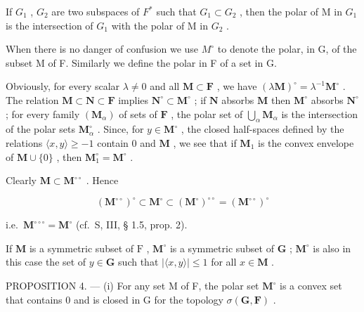 If \(G_{1}\) , \(G_{2}\) are two subspaces of \(F^{*}\) such that \(G_{1} \subset G_{2}\) , then the polar of M in \(G_{1}\) is the intersection of \(G_{1}\) with the polar of M in \(G_{2}\) .

When there is no danger of confusion we use \(M^{\circ}\) to denote the polar, in G, of the subset M of F. Similarly we define the polar in F of a set in G.

Obviously, for every scalar \(\lambda \neq 0\) and all \(\mathbf{M} \subset \mathbf{F}\) , we have \((\lambda \mathbf{M})^{\circ} = \lambda^{-1} \mathbf{M}^{\circ}\) . The relation \(\mathbf{M} \subset \mathbf{N} \subset \mathbf{F}\) implies \(\mathbf{N}^{\circ} \subset \mathbf{M}^{\circ}\) ; if \(\mathbf{N}\) absorbs \(\mathbf{M}\) then \(\mathbf{M}^{\circ}\) absorbs \(\mathbf{N}^{\circ}\) ; for every family \((\mathbf{M}_{\alpha})\) of sets of \(\mathbf{F}\) , the polar set of \(\bigcup_{\alpha} \mathbf{M}_{\alpha}\) is the intersection of the polar sets \(\mathbf{M}_{\alpha}^{\circ}\) . Since, for \(y \in \mathbf{M}^{\circ}\) , the closed half-spaces defined by the relations \(\langle x, y \rangle \geqslant -1\) contain 0 and \(\mathbf{M}\) , we see that if \(\mathbf{M}_{1}\) is the convex envelope of \(\mathbf{M} \cup \{0\}\) , then \(\mathbf{M}_{1}^{\circ} = \mathbf{M}^{\circ}\) .

Clearly \(\mathbf{M} \subset \mathbf{M}^{\circ \circ}\) . Hence

\[
(\mathbf {M} ^ {\circ \circ}) ^ {\circ} \subset \mathbf {M} ^ {\circ} \subset (\mathbf {M} ^ {\circ}) ^ {\circ \circ} = (\mathbf {M} ^ {\circ \circ}) ^ {\circ}
\]

i.e.~\(\mathbf{M}^{\circ \circ \circ} = \mathbf{M}^{\circ}\) (cf.~S, III, § 1.5, prop. 2).

If \(\mathbf{M}\) is a symmetric subset of \(\mathrm{F}\) , \(\mathbf{M}^{\circ}\) is a symmetric subset of \(\mathbf{G}\) ; \(\mathbf{M}^{\circ}\) is also in this case the set of \(y \in \mathbf{G}\) such that \(|\langle x, y \rangle| \leqslant 1\) for all \(x \in \mathbf{M}\) .

PROPOSITION 4. --- (i) For any set M of F, the polar set \(\mathbf{M}^{\circ}\) is a convex set that contains 0 and is closed in G for the topology \(\sigma(\mathbf{G},\mathbf{F})\) .


